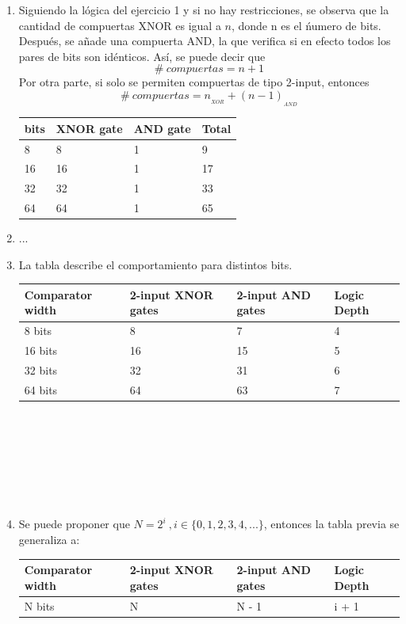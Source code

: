 \documentclass[11pt,a4paper]{article}
\begin{document}
\begin{enumerate}
\begin{enumerate}[label=(\alph*)]
\item Siguiendo la lógica del ejercicio 1 y si no hay restricciones, se observa que la cantidad de compuertas XNOR es igual a $n$, donde n es el ńumero de bits. Después, se añade una compuerta AND, la que verifica si en efecto  todos los pares de bits son idénticos. Así, se puede decir que
$$\# \ compuertas = n + 1$$
Por otra parte, si solo se permiten compuertas de tipo 2-input, entonces
$$\# \ compuertas = n_{_{XOR}} + (n - 1)_{_{AND}}$$
\begin{table}[h!]
\centering
\begin{tabular}{|l|l|l|l|}
\hline
bits & XNOR gate & AND gate&Total\\
\hline
8&8&1&9\\
\hline
16&16&1&17\\
\hline
32&32&1&33\\
\hline
64&64&1&65\\
\hline
\end{tabular}
\end{table}
\item ...
\item La tabla describe el comportamiento para distintos bits.
\begin{table}[h!]
\centering
\begin{tabular}{|l|l|l|l|}
\hline
Comparator width &2-input XNOR gates &2-input AND gates&Logic Depth\\
\hline
8 bits&8&7&4\\
\hline
16 bits&16&15&5\\
\hline
32 bits&32&31&6\\
\hline
64 bits&64&63&7\\
\hline
\end{tabular}
\end{table}
\\
\\
\\
\\
\\
\\
\item Se puede proponer que $N = 2^i \ , i\in \{0,1,2,3,4,...\}$, entonces la tabla previa se generaliza a:
\begin{table}[h!]
\centering
\begin{tabular}{|l|l|l|l|}
\hline
Comparator width &2-input XNOR gates &2-input AND gates&Logic Depth\\
\hline
N bits&N&N - 1& i + 1\\
\hline
\end{tabular}
\end{table}
\end{enumerate}


\end{enumerate}
\end{document}

